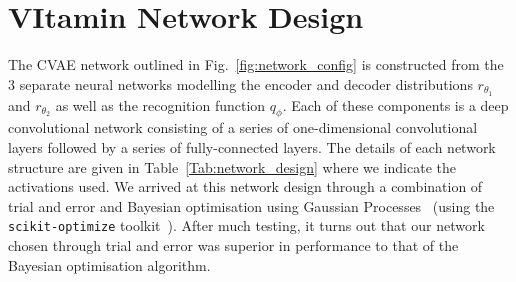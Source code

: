 \section{VItamin Network Design}\label{sec:network_design}
%
%

%
%
The \ac{CVAE} network outlined in Fig.~\ref{fig:network_config} is 
constructed from the 3 separate neural networks modelling the encoder and 
decoder distributions $r_{\theta_1}$ and $r_{\theta_2}$ as well as 
the recognition function $q_{\phi}$. Each of these components is a 
deep convolutional network consisting of a series of 
one-dimensional convolutional layers followed by a series of 
fully-connected layers. The details of each network structure are 
given in Table~\ref{Tab:network_design} where we indicate the 
activations used. We arrived at this network design through a combination 
of trial and error and Bayesian optimisation using Gaussian
Processes~\cite{Siria2020.06.11.144253} (using the \texttt{scikit-optimize}
toolkit~\cite{scikit-learn}). After much testing, it turns out that 
our network chosen through trial and error was superior in performance 
to that of the Bayesian optimisation algorithm. 

